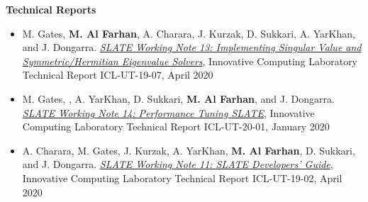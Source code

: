 \documentclass[10pt,a4paper]{article}
\begin{document}
\begin{cv}
\begin{cvlist}{}
\vspace{+2mm}
{\bf Technical Reports}
\vspace{-2mm}
\begin{itemize}[label=\raisebox{0.25ex}{\tiny$\bullet$},nosep, leftmargin=*]
\item
M. Gates, \textbf{M. Al Farhan}, A. Charara, J. Kurzak, D. Sukkari, A. YarKhan, and J. Dongarra.
\href{http://www.icl.utk.edu/publications/swan-013}
{\textit{SLATE Working Note 13: Implementing Singular Value and Symmetric/Hermitian Eigenvalue Solvers}},
Innovative Computing Laboratory Technical Report ICL-UT-19-07, April 2020
\item
M. Gates, , A. YarKhan, D. Sukkari,
\textbf{M. Al Farhan}, and J. Dongarra.
\href{http://www.icl.utk.edu/publications/swan-014}
{\textit{SLATE Working Note 14: Performance Tuning SLATE}},
Innovative Computing Laboratory Technical Report ICL-UT-20-01, January 2020
\item
A. Charara, M. Gates, J. Kurzak, A. YarKhan,
\textbf{M. Al Farhan}, D. Sukkari, and J. Dongarra.
\href{http://www.icl.utk.edu/publications/swan-011}
{\textit{SLATE Working Note 11: SLATE Developers' Guide}},
Innovative Computing Laboratory Technical Report ICL-UT-19-02, April 2020
\end{itemize}



\end{cvlist}
\end{cv}
\end{document}
